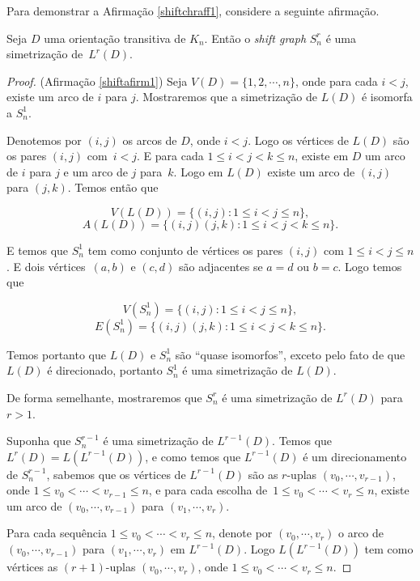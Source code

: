 Para demonstrar a Afirmação \ref{shiftchraff1}, considere a seguinte afirmação.

\begin{afirmacao}\label{shiftafirm1}
Seja $D$ uma orientação transitiva de $K_n$. Então o \textit{shift graph} $S_n^r$ é uma simetrização de~$L^r(D)$.
\end{afirmacao}

\begin{proof}(Afirmação \ref{shiftafirm1})
Seja $V(D) = \{1,2,\cdots, n\}$, onde para cada $i < j$, existe um arco de $i$ para $j$. Mostraremos que a simetrização de $L(D)$ é isomorfa a $S_n^1$.

Denotemos por $(i,j)$ os arcos de $D$, onde $i < j$. Logo os vértices de $L(D)$ são os pares $(i,j)$ com~$i < j$. E para cada $1 \leq i < j < k \leq n$, existe em $D$ um arco de $i$ para $j$ e um arco de $j$ para~$k$. Logo em $L(D)$ existe um arco de $(i,j)$ para $(j,k)$. Temos então que

\[V(L(D)) = \{(i,j) : 1\leq i < j \leq n\},\]
\[A(L(D)) = \{(i,j)(j,k) : 1\leq i <j<k\leq n\}.\]

E temos que $S_n^1$ tem como conjunto de vértices os pares $(i,j)$ com $1\leq i<j\leq n$. E dois vértices~$(a,b)$ e $(c,d)$ são adjacentes se $a = d$ ou $b = c$. Logo temos que

\[V(S_n^1) = \{(i,j) : 1\leq i<j\leq n\},\]
\[E(S_n^1) = \{(i,j)(j,k) : 1\leq i<j<k\leq n\}.\]

Temos portanto que $L(D)$ e $S_n^1$ são ``quase isomorfos'', exceto pelo fato de que $L(D)$ é direcionado, portanto $S_n^1$ é uma simetrização de $L(D)$.

De forma semelhante, mostraremos que $S_n^r$ é uma simetrização de $L^r(D)$ para $r>1$.

Suponha que $S_n^{r-1}$ é uma simetrização de $L^{r-1}(D)$. Temos que $L^r(D) = L(L^{r-1}(D))$, e como temos que $L^{r-1}(D)$ é um direcionamento de $S_n^{r-1}$, sabemos que os vértices de $L^{r-1}(D)$ são as $r$-uplas $(v_0,\cdots,v_{r-1})$, onde $1\leq v_0 < \cdots < v_{r-1} \leq n$, e para cada escolha de~$1\leq v_0 < \cdots < v_{r} \leq n$, existe um arco de $(v_0,\cdots,v_{r-1})$ para $(v_1,\cdots,v_r)$.

Para cada sequência $1\leq v_0 < \cdots < v_{r} \leq n$, denote por $(v_0,\cdots,v_{r})$ o arco de $(v_0,\cdots,v_{r-1})$ para $(v_1,\cdots,v_r)$ em $L^{r-1}(D)$. Logo $L(L^{r-1}(D))$ tem como vértices as $(r+1)$-uplas $(v_0,\cdots,v_{r})$, onde $1\leq v_0 < \cdots < v_r \leq n$.


\end{proof}
